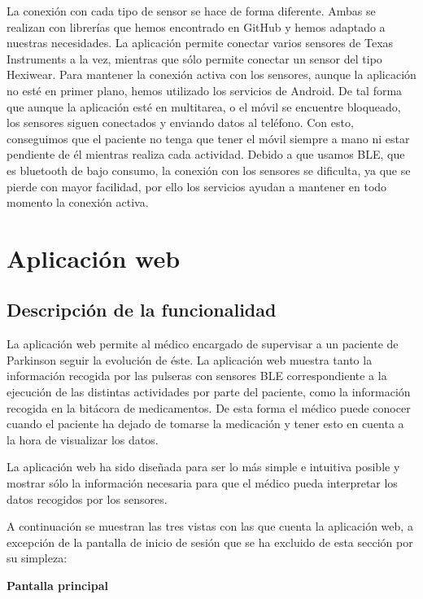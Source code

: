 \documentclass[11pt,spanish]{article}
\begin{document}
La conexión con cada tipo de sensor se hace de forma diferente. Ambas se realizan con librerías que hemos encontrado en GitHub \cite{github_ble} y hemos adaptado a nuestras necesidades. La aplicación permite conectar varios sensores de Texas Instruments a la vez, mientras que sólo permite conectar un sensor del tipo Hexiwear. Para mantener la conexión activa con los sensores, aunque la aplicación no esté en primer plano, hemos utilizado los servicios de Android. De tal forma que aunque la aplicación esté en multitarea, o el móvil se encuentre bloqueado, los sensores siguen conectados y enviando datos al teléfono. Con esto, conseguimos que el paciente no tenga que tener el móvil siempre a mano ni estar pendiente de él mientras realiza cada actividad. Debido a que usamos BLE, que es bluetooth de bajo consumo, la conexión con los sensores se dificulta, ya que se pierde con mayor facilidad, por ello los servicios ayudan a mantener en todo momento la conexión activa.
\newpage

\section{Aplicación web}
\subsection{Descripción de la funcionalidad}
La aplicación web permite al médico encargado de supervisar a un paciente de Parkinson seguir la evolución de éste. La aplicación web muestra tanto la información recogida por las pulseras con sensores BLE correspondiente a la ejecución de las distintas actividades por parte del paciente, como la información recogida en la bitácora de medicamentos. De esta forma el médico puede conocer cuando el paciente ha dejado de tomarse la medicación y tener esto en cuenta a la hora de visualizar los datos.
\newline

La aplicación web ha sido diseñada para ser lo más simple e intuitiva posible y mostrar sólo la información necesaria para que el médico pueda interpretar los datos recogidos por los sensores.
\newline

A continuación se muestran las tres vistas con las que cuenta la aplicación web, a excepción de la pantalla de inicio de sesión que se ha excluido de esta sección por su simpleza:
\newline

\textbf{Pantalla principal}
\newline
\end{document}
